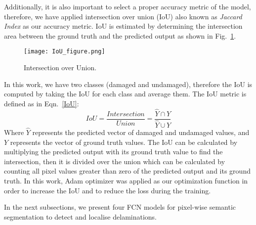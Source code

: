 Additionally, it is also important to select a proper accuracy metric of the model, therefore, we have applied intersection over union (IoU) also known as \emph{Jaccard Index} as our accuracy metric. 
IoU is estimated by determining the intersection area between the ground truth and the predicted output as shown in Fig.~\ref{fig:iou}.
\begin{figure}
	\centering
	\texttt{[image: IoU\_figure.png]}
	\caption{Intersection over Union.}
	\label{fig:iou}
\end{figure}
In this work, we have two classes (damaged and undamaged), therefore the IoU is computed by taking the IoU for each class and average them.
The IoU metric is defined as in Eqn.~\ref{IoU}:
\begin{equation}
IoU = \frac{Intersection}{Union} = \frac{\hat{Y} \cap Y}{\hat{Y} \cup Y} 
\label{IoU}
\end{equation}
Where \(\hat{Y}\) represents the predicted vector of damaged and undamaged values, and \(Y\) represents the vector of ground truth values.
The IoU can be calculated by multiplying the predicted output with its ground truth value to find the intersection, then it is divided over the union which can be calculated by counting all pixel values greater than zero of the predicted output and its ground truth.
In this work, Adam optimizer was applied as our optimization function in order to increase the IoU and to reduce the loss during the training.

In the next subsections, we present four FCN models for pixel-wise semantic segmentation to detect and localise delaminations.

